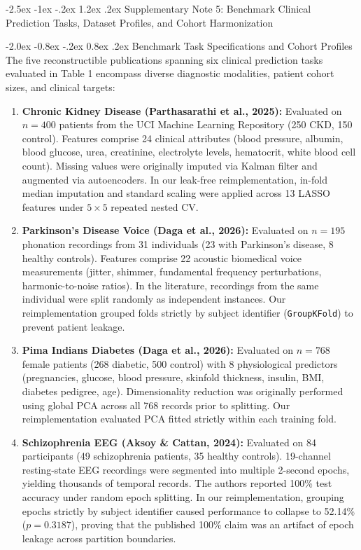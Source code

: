 \documentclass[10pt,a4paper]{article}
\makeatletter
\renewcommand{\section}{\@startsection{section}{1}{\z@}%
  {-2.5ex \@plus -1ex \@minus -.2ex}%
  {1.2ex \@plus.2ex}%
  {\normalfont\Large\sffamily\bfseries\color{naturedark}}}
\renewcommand{\subsection}{\@startsection{subsection}{2}{\z@}%
  {-2.0ex \@plus -0.8ex \@minus -.2ex}%
  {0.8ex \@plus.2ex}%
  {\normalfont\large\sffamily\bfseries\color{naturedark}}}
\makeatother
\begin{document}
\section{Supplementary Note 5: Benchmark Clinical Prediction Tasks, Dataset Profiles, and Cohort Harmonization}

\subsection{Benchmark Task Specifications and Cohort Profiles}
The five reconstructible publications spanning six clinical prediction tasks evaluated in Table 1 encompass diverse diagnostic modalities, patient cohort sizes, and clinical targets:
\begin{enumerate}
  \item \textbf{Chronic Kidney Disease (Parthasarathi et al., 2025):} Evaluated on $n = 400$ patients from the UCI Machine Learning Repository (250 CKD, 150 control). Features comprise 24 clinical attributes (blood pressure, albumin, blood glucose, urea, creatinine, electrolyte levels, hematocrit, white blood cell count). Missing values were originally imputed via Kalman filter and augmented via autoencoders. In our leak-free reimplementation, in-fold median imputation and standard scaling were applied across 13 LASSO features under $5 \times 5$ repeated nested CV.
  \item \textbf{Parkinson's Disease Voice (Daga et al., 2026):} Evaluated on $n = 195$ phonation recordings from 31 individuals (23 with Parkinson's disease, 8 healthy controls). Features comprise 22 acoustic biomedical voice measurements (jitter, shimmer, fundamental frequency perturbations, harmonic-to-noise ratios). In the literature, recordings from the same individual were split randomly as independent instances. Our reimplementation grouped folds strictly by subject identifier (\texttt{GroupKFold}) to prevent patient leakage.
  \item \textbf{Pima Indians Diabetes (Daga et al., 2026):} Evaluated on $n = 768$ female patients (268 diabetic, 500 control) with 8 physiological predictors (pregnancies, glucose, blood pressure, skinfold thickness, insulin, BMI, diabetes pedigree, age). Dimensionality reduction was originally performed using global PCA across all 768 records prior to splitting. Our reimplementation evaluated PCA fitted strictly within each training fold.
  \item \textbf{Schizophrenia EEG (Aksoy \& Cattan, 2024):} Evaluated on 84 participants (49 schizophrenia patients, 35 healthy controls). 19-channel resting-state EEG recordings were segmented into multiple 2-second epochs, yielding thousands of temporal records. The authors reported 100\% test accuracy under random epoch splitting. In our reimplementation, grouping epochs strictly by subject identifier caused performance to collapse to 52.14\% ($p = 0.3187$), proving that the published 100\% claim was an artifact of epoch leakage across partition boundaries.

\end{enumerate}
\end{document}
